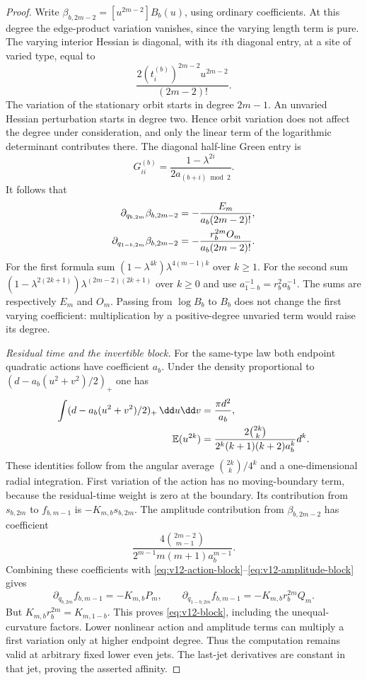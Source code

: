 \begin{proof}
Write $\beta_{b,2m-2}=[u^{2m-2}]B_b(u)$, using ordinary
coefficients. At this degree the edge-product variation vanishes,
since the varying length term is pure. The varying interior Hessian
is diagonal, with its $i$th diagonal entry, at a site of varied type,
equal to
\[
              \frac{2(t_i^{(b)})^{2m-2}u^{2m-2}}{(2m-2)!}.
\]
The variation of the stationary orbit starts in degree $2m-1$.
An unvaried Hessian perturbation starts in degree two. Hence orbit
variation does not affect the degree under consideration, and only
the linear term of the logarithmic determinant contributes there.
The diagonal half-line Green entry is
\[
 G^{(b)}_{ii}=\frac{1-\lambda^{2i}}{2a_{(b+i)\bmod2}}.
\]
It follows that
\begin{align}
 \partial_{q_{b,2m}}\beta_{b,2m-2}
 &=-\frac{E_m}{a_b(2m-2)!},\notag\\
 \partial_{q_{1-b,2m}}\beta_{b,2m-2}
 &=-\frac{r_b^{2m}O_m}{a_b(2m-2)!}.
                                      \label{eq:v12-amplitude-block}
\end{align}
For the first formula sum $(1-\lambda^{4k})\lambda^{4(m-1)k}$
over $k\ge1$. For the second sum
$(1-\lambda^{2(2k+1)})\lambda^{(2m-2)(2k+1)}$ over $k\ge0$
and use $a_{1-b}^{-1}=r_b^2a_b^{-1}$. The sums are respectively
$E_m$ and $O_m$. Passing from $\log B_b$ to $B_b$ does not change
the first varying coefficient: multiplication by a positive-degree
unvaried term would raise its degree.

\medskip\noindent\emph{Residual time and the invertible block.}
For the same-type law both endpoint quadratic actions have coefficient
$a_b$. Under the density proportional to
$(d-a_b(u^2+v^2)/2)_+$ one has
\begin{align}
 \int(d-a_b(u^2+v^2)/2)_+\,\dd u\dd v&=\frac{\pi d^2}{a_b},\notag\\
 \mathbb E(u^{2k})
 &=\frac{2\binom{2k}{k}}{2^k(k+1)(k+2)a_b^k}d^k.
                                      \label{eq:v12-moment}
\end{align}
These identities follow from the angular average
$\binom{2k}{k}/4^k$ and a one-dimensional radial integration.
First variation of the action has no moving-boundary term, because
the residual-time weight is zero at the boundary. Its contribution
from $s_{b,2m}$ to $f_{b,m-1}$ is $-K_{m,b}s_{b,2m}$.
The amplitude contribution from $\beta_{b,2m-2}$ has coefficient
\[
 \frac{4\binom{2m-2}{m-1}}
             {2^{m-1}m(m+1)a_b^{m-1}}.
\]
Combining these coefficients with
\eqref{eq:v12-action-block}--\eqref{eq:v12-amplitude-block} gives
\[
 \partial_{q_{b,2m}}f_{b,m-1}=-K_{m,b}P_m,
 \qquad
 \partial_{q_{1-b,2m}}f_{b,m-1}=-K_{m,b}r_b^{2m}Q_m.
\]
But $K_{m,b}r_b^{2m}=K_{m,1-b}$. This proves
\eqref{eq:v12-block}, including the unequal-curvature factors.
Lower nonlinear action and amplitude terms can multiply a first
variation only at higher endpoint degree. Thus the computation remains
valid at arbitrary fixed lower even jets. The last-jet derivatives
are constant in that jet, proving the asserted affinity.


\end{proof}
